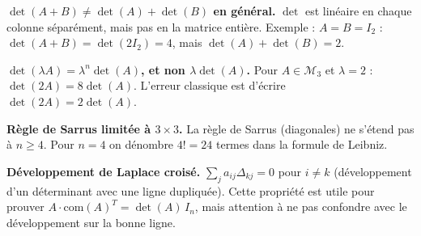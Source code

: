 \begin{mdframed}[style=cexbar]
  \textbf{$\det(A+B) \neq \det(A)+\det(B)$ en général.}\enspace%
  $\det$ est linéaire en chaque colonne séparément, mais pas en la matrice
  entière. Exemple :
  $A = B = I_2$ : $\det(A+B) = \det(2I_2) = 4$, mais $\det(A)+\det(B) = 2$.

  \smallskip\noindent
  \textbf{$\det(\lambda A) = \lambda^n \det(A)$, et non $\lambda\det(A)$.}\enspace%
  Pour $A \in \mathcal{M}_3$ et $\lambda=2$ : $\det(2A) = 8\det(A)$.
  L'erreur classique est d'écrire $\det(2A)=2\det(A)$.

  \smallskip\noindent
  \textbf{Règle de Sarrus limitée à $3\times 3$.}\enspace%
  La règle de Sarrus (diagonales) ne s'étend pas à $n\geq 4$.
  Pour $n=4$ on dénombre $4!=24$ termes dans la formule de Leibniz.

  \smallskip\noindent
  \textbf{Développement de Laplace croisé.}\enspace%
  $\sum_j a_{ij}\Delta_{kj} = 0$ pour $i\neq k$ (développement d'un déterminant
  avec une ligne dupliquée). Cette propriété est utile pour prouver
  $A\cdot{\mathrm{com}(A)}^T = \det(A)\,I_n$, mais attention à ne pas confondre
  avec le développement sur la bonne ligne.
\end{mdframed}

\vspace{6pt}
\exolabel

